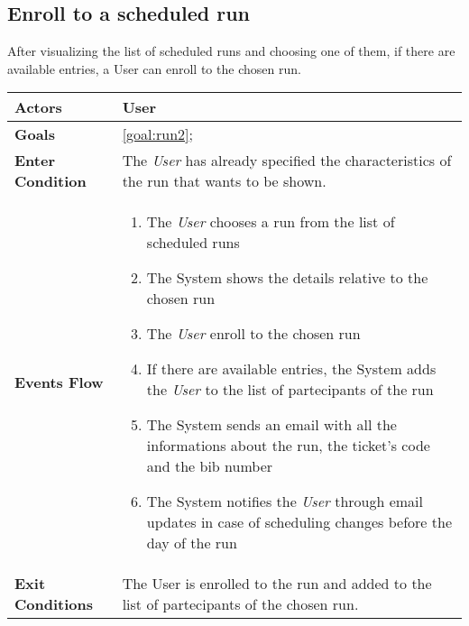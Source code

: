   \subsection{Enroll to a scheduled run}
After visualizing the list of scheduled runs and choosing one of them, if there are available entries, a User can enroll to the chosen run. 

\begin{table}[H]
	\centering
    
    \begin{tabular}{|p{3.5cm}|p{10.3cm}|}
    
    \hline
    \textbf{\large{Actors}}  			& \tabitem User 	\\
    				 					
    \hline
    \textbf{\large{Goals}} 				& \ref{goal:run2};\\
    
    \hline
    \textbf{\large{Enter Condition}}	& The \emph{User} has already specified the characteristics of the run that wants to be shown.		\\
    
    \hline
    \textbf{\large{Events Flow}}		& \begin{enumerate}[leftmargin=0.5cm]
                                          	\item The \emph{User} chooses a run from the list of scheduled runs 
                                          	 \item The System shows the details relative to the chosen run
                                            \item The \emph{User} enroll to the chosen run
                                            \item If there are available entries, the System adds the \emph{User} to the list of partecipants of the run
                                             \item The System sends an email with all the informations about the run, the ticket's code and the bib number
                                              \item The System notifies the \emph{User} through email updates in case of scheduling changes before the day of the run
                                             \end{enumerate}
    										\\
    \hline
    \textbf{\large{Exit Conditions}}    & The User is enrolled to the run and added to the list of partecipants of the chosen run.  \\
    

\end{tabular}
\end{table}
